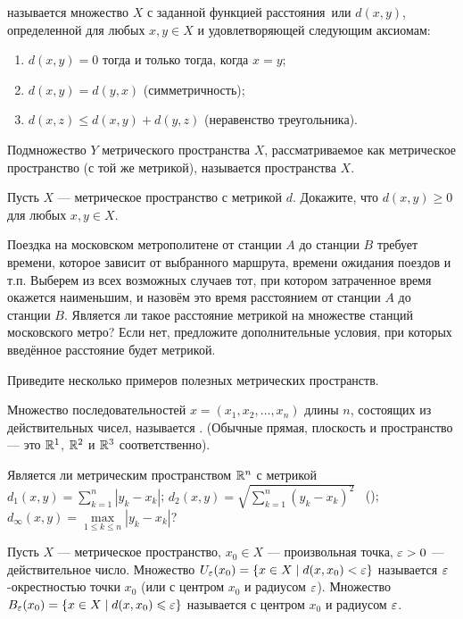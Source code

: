 \documentclass[a4paper,12pt]{article}
\begin{document}




 называется множество $X$ с заданной
функцией  расстояния\ или  $d(x,y)$,
определенной для любых $x,y\in X$ и удовлетворяющей следующим аксиомам:
\begin{enumerate}
\item
$d(x,y)=0$ тогда и только тогда, когда $x=y$;
\item
$d(x,y)=d(y,x)$ (симметричность);
\item
$d(x,z)\le d(x,y)+d(y,z)$ (неравенство треугольника).
\end{enumerate}

Подмножество $Y$ метрического пространства $X$, рассматриваемое как
метрическое пространство (с той же метрикой), называется
 пространства $X$.

Пусть $X$ --- метрическое пространство с метрикой $d$.
Докажите, что $d(x,y)\ge0$ для любых $x,y\in X$.


Поездка на московском метрополитене
от станции $A$ до станции $B$ требует времени,
которое зависит от выбранного маршрута, времени ожидания поездов
и т.п. Выберем из всех возможных случаев тот,
при котором затраченное время окажется наименьшим, и назов\"ем это время
расстоянием от станции $A$ до станции $B$.
Является ли такое расстояние метрикой на множестве станций московского метро?
Если нет, предложите дополнительные условия, при которых введ\"енное
расстояние будет метрикой.

Приведите несколько примеров полезных метрических пространств.

Множество последовательностей
$x=(x_1,x_2,\dots,x_n)$
длины $n$, состоящих из действительных чисел,
называется .
(Обычные прямая, плоскость и пространство --- это $\mathbb{R}^1$,
$\mathbb{R}^2$ и $\mathbb{R}^3$ соответственно).

\label{R^n}
Является ли метрическим пространством $\mathbb{R}^n$ с метрикой
$d_1(x,y)=\sum\limits_{k=1}^{n}|y_k-x_k|$;
$d_2(x,y)=\sqrt{\sum\limits_{k=1}^{n}(y_k-x_k)^2}$
\ ();
$d_\infty(x,y)=\max\limits_{1\le k\le n}|y_k-x_k|$?

Пусть $X$ --- метрическое пространство, $x_0\in X$ --- произвольная
точка, $\varepsilon>0$ --- действительное число.
Множество $U_\varepsilon(x_0)=\{x\in X\mid d(x,x_0)<\varepsilon\}$
называется $\varepsilon$-окрестностью точки $x_0$ (или
 с центром $x_0$ и радиусом $\varepsilon$).
Множество \\$B_\varepsilon(x_0)=\{x\in X\mid d(x,x_0)\leqslant\varepsilon\}$
называется  с центром $x_0$ и радиусом $\varepsilon$.
\end{document}
